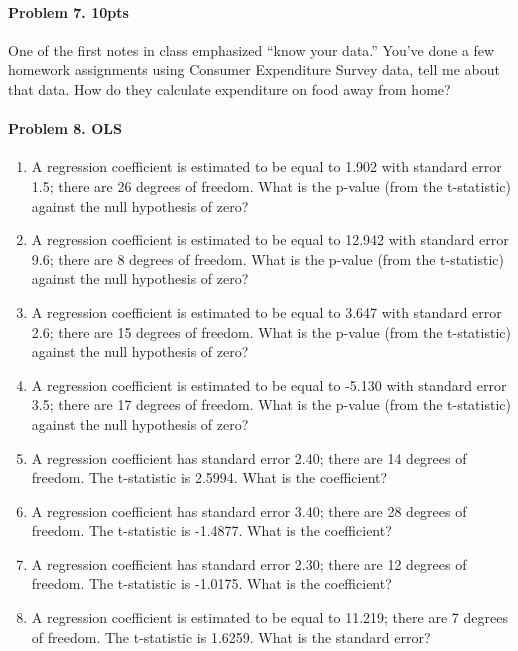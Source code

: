 \documentclass[]{article}
\providecommand{\tightlist}{%
  \setlength{\itemsep}{0pt}\setlength{\parskip}{0pt}}
\let\oldparagraph\paragraph
\renewcommand{\paragraph}[1]{\oldparagraph{#1}\mbox{}}
\begin{document}
\paragraph{Problem 7. 10pts}\label{problem-7.-10pts}

One of the first notes in class emphasized ``know your data.'' You've
done a few homework assignments using Consumer Expenditure Survey data,
tell me about that data. How do they calculate expenditure on food away
from home?

\paragraph{Problem 8. OLS}\label{problem-8.-ols}

\begin{enumerate}
\def\labelenumi{\roman{enumi}.}
\tightlist
\item
  A regression coefficient is estimated to be equal to 1.902 with
  standard error 1.5; there are 26 degrees of freedom. What is the
  p-value (from the t-statistic) against the null hypothesis of zero?
\item
  A regression coefficient is estimated to be equal to 12.942 with
  standard error 9.6; there are 8 degrees of freedom. What is the
  p-value (from the t-statistic) against the null hypothesis of zero?
\item
  A regression coefficient is estimated to be equal to 3.647 with
  standard error 2.6; there are 15 degrees of freedom. What is the
  p-value (from the t-statistic) against the null hypothesis of zero?
\item
  A regression coefficient is estimated to be equal to -5.130 with
  standard error 3.5; there are 17 degrees of freedom. What is the
  p-value (from the t-statistic) against the null hypothesis of zero?
\item
  A regression coefficient has standard error 2.40; there are 14 degrees
  of freedom. The t-statistic is 2.5994. What is the coefficient?
\item
  A regression coefficient has standard error 3.40; there are 28 degrees
  of freedom. The t-statistic is -1.4877. What is the coefficient?
\item
  A regression coefficient has standard error 2.30; there are 12 degrees
  of freedom. The t-statistic is -1.0175. What is the coefficient?
\item
  A regression coefficient is estimated to be equal to 11.219; there are
  7 degrees of freedom. The t-statistic is 1.6259. What is the standard
  error?
\end{enumerate}
\end{document}
